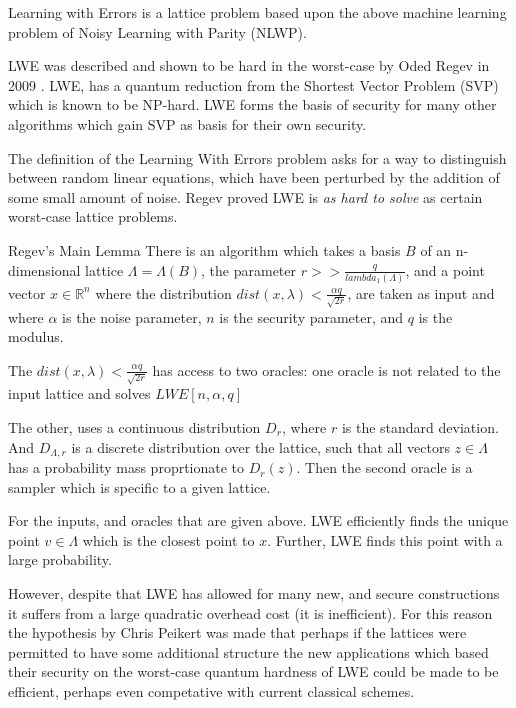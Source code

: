 Learning with Errors is a lattice problem based upon the above machine learning problem of Noisy Learning with Parity (NLWP). 

LWE was described and shown to be hard in the worst-case by Oded Regev in 2009 \cite{Reg2009}. 
LWE, has a quantum reduction from the Shortest Vector Problem (SVP) which is known to be NP-hard. LWE forms the basis of security for many other algorithms which gain SVP as basis for their own security.


The definition of the Learning With Errors problem asks for a way to distinguish between random linear equations, which have been perturbed by the addition of some small amount of noise. Regev proved LWE is \emph{as hard to solve} as certain worst-case lattice problems.


\begin{lemm}{Regev's Main Lemma}
    There is an algorithm which takes a basis $B$ of an n-dimensional lattice $\Lambda = \Lambda(B)$, the parameter $r >> \frac{q}{lambda_{1}(\Lambda)}$, and a point vector $x \in \mathbb{R}^{n}$ where the distribution $dist(x, \lambda) < \frac{\alpha q}{\sqrt{2r}}$, are taken as input and where $\alpha$ is the noise parameter, $n$ is the security parameter, and $q$ is the modulus.
    
    The $dist(x, \lambda) < \frac{\alpha q}{\sqrt{2r}}$ has access to two oracles: 
    one oracle is not related to the input lattice and solves $LWE[n, \alpha, q]$ 
    
    The other, uses a continuous distribution $D_{r}$, where $r$ is the standard deviation. And $D_{\Lambda,r}$ is a discrete distribution over the lattice, such that all vectors $z \in \Lambda$ has a probability mass proprtionate to $D_{r}(z)$. Then the second oracle is a sampler which is specific to a given lattice.
    
For the inputs, and oracles that are given above. LWE efficiently finds the unique point $v \in \Lambda$ which is the closest point to $x$. Further, LWE finds this point with a large probability. 
\end{lemm}


However, despite that LWE has allowed for many new, and secure constructions it suffers from a large quadratic overhead cost (it is inefficient). For this reason the hypothesis by Chris Peikert was made that perhaps if the lattices were permitted to have some additional structure the new applications which based their security on the worst-case quantum hardness of LWE could be made to be efficient, perhaps even competative with current classical schemes.


